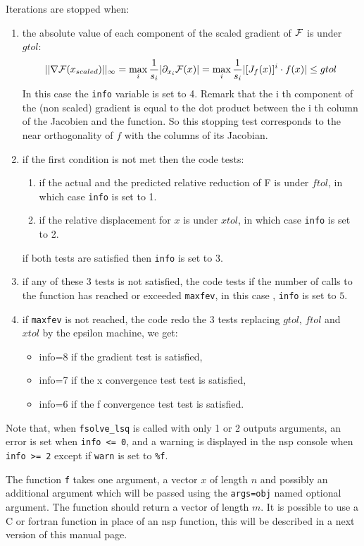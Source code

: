 \begin{mandescription}
Iterations are stopped when:
\begin{enumerate}
\item the absolute value of each component of the scaled gradient of ${\cal F}$ is under $gtol$: 
$$
||\nabla{\cal F}(x_{scaled})||_{\infty} = \max_i \frac{1}{s_i} | \partial_{x_i} {\cal F}(x) | =
\max_i \frac{1}{s_i} | [J_f(x)]^i \cdot f(x) | \le gtol
$$
In this case the \verb+info+ variable is set to 4. Remark that the i th component of the (non scaled) 
gradient is equal to the dot product between the i th column of the Jacobien and the function.
So this stopping test corresponds to the near orthogonality of $f$ with the columns of its
Jacobian.
\item if the first condition is not met then the code tests:
      \begin{enumerate}
      \item if the actual and the predicted relative reduction of {\cal F} is under $ftol$, in which case \verb+info+ is set to 1.
      \item if the relative displacement for $x$ is under $xtol$, in which case \verb+info+ is set to 2. 
      \end{enumerate}
      if both tests are satisfied then \verb+info+ is set to 3.
\item if any of these 3 tests is not satisfied, the code tests if the number of calls to the function has reached or 
      exceeded \verb+maxfev+, in this case , \verb+info+ is set to $5$.
\item if \verb+maxfev+ is not reached, the code redo the 3 tests replacing $gtol$, $ftol$ and $xtol$ by the epsilon
      machine, we get:
      \begin{itemize}
      \item info=8 if the gradient test is satisfied,  
      \item info=7 if the x convergence test test is satisfied,  
      \item info=6 if the f convergence test test is satisfied.  
      \end{itemize}
\end{enumerate}
Note that, when \verb+fsolve_lsq+ is called with only 1 or 2 outputs arguments, an error is set 
when \verb+info <= 0+, and a warning is displayed in the nsp console when \verb+info >= 2+ except 
if \verb+warn+ is set to \verb+%f+. 

The function \verb+f+ takes one argument, a vector $x$ of length $n$ and possibly an additional
argument which will be passed using the \verb+args=obj+ named optional argument. The function
should return a vector of length $m$. It is possible to use a C or fortran function in place
of an nsp function, this will be described in a next version of this manual page.


\end{mandescription}
